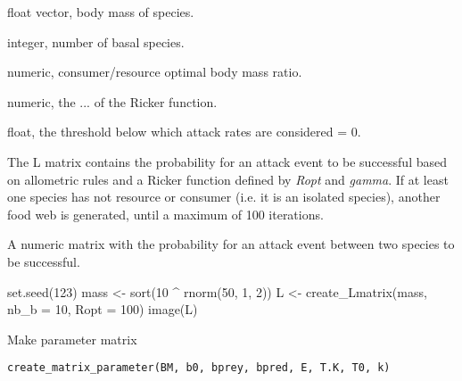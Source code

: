 \documentclass[letterpaper]{book}
\begin{document}
\begin{Arguments}
\begin{ldescription}
\item[\code{BM}] float vector, body mass of species.

\item[\code{nb\_b}] integer, number of basal species.

\item[\code{Ropt}] numeric, consumer/resource optimal body mass ratio.

\item[\code{gamma}] numeric, the ... of the Ricker function.

\item[\code{th}] float, the threshold below which attack rates are considered = 0.
\end{ldescription}
\end{Arguments}
%
\begin{Details}\relax
The L matrix contains the probability for an attack event to be
successful based on allometric rules and a Ricker function defined by
\emph{Ropt} and \emph{gamma}. If at least one species has not resource or
consumer (i.e. it is an isolated species), another food web is generated,
until a maximum of 100 iterations.
\end{Details}
%
\begin{Value}
A numeric matrix with the probability for an attack event between two
species to be successful.
\end{Value}
%
\begin{Examples}
\begin{ExampleCode}
set.seed(123)
mass <- sort(10 ^ rnorm(50, 1, 2))
L <- create_Lmatrix(mass, nb_b = 10, Ropt = 100)
image(L)
\end{ExampleCode}
\end{Examples}
%
\begin{Description}\relax
Make parameter matrix
\end{Description}
%
\begin{Usage}
\begin{verbatim}
create_matrix_parameter(BM, b0, bprey, bpred, E, T.K, T0, k)
\end{verbatim}
\end{Usage}
%
\end{document}
